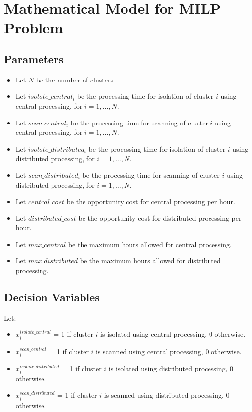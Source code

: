 \documentclass{article}
\begin{document}
\section*{Mathematical Model for MILP Problem}

\subsection*{Parameters}
\begin{itemize}
    \item Let $N$ be the number of clusters.
    \item Let $isolate\_central_{i}$ be the processing time for isolation of cluster $i$ using central processing, for $i = 1, \ldots, N$.
    \item Let $scan\_central_{i}$ be the processing time for scanning of cluster $i$ using central processing, for $i = 1, \ldots, N$.
    \item Let $isolate\_distributed_{i}$ be the processing time for isolation of cluster $i$ using distributed processing, for $i = 1, \ldots, N$.
    \item Let $scan\_distributed_{i}$ be the processing time for scanning of cluster $i$ using distributed processing, for $i = 1, \ldots, N$.
    \item Let $central\_cost$ be the opportunity cost for central processing per hour.
    \item Let $distributed\_cost$ be the opportunity cost for distributed processing per hour.
    \item Let $max\_central$ be the maximum hours allowed for central processing.
    \item Let $max\_distributed$ be the maximum hours allowed for distributed processing.
\end{itemize}

\subsection*{Decision Variables}
Let:
\begin{itemize}
    \item $x_{i}^{isolate\_central}$ = 1 if cluster $i$ is isolated using central processing, 0 otherwise.
    \item $x_{i}^{scan\_central}$ = 1 if cluster $i$ is scanned using central processing, 0 otherwise.
    \item $x_{i}^{isolate\_distributed}$ = 1 if cluster $i$ is isolated using distributed processing, 0 otherwise.
    \item $x_{i}^{scan\_distributed}$ = 1 if cluster $i$ is scanned using distributed processing, 0 otherwise.
\end{itemize}
\end{document}
